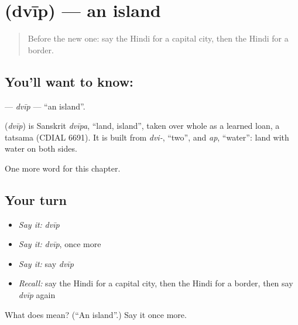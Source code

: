 \section[\texorpdfstring{\hi{द्वीप} (dvīp)}{द्वीप (dvīp)}]{ (dvīp) — an island}

\label{lesson:HI-C200-dvip}



\begin{quote}
Before the new one: say the Hindi for a capital city, then the Hindi for a border.
\end{quote}

\subsection*{You'll want to know: }
\textbf{} — \emph{dvīp} — \textquotedblleft{}an island\textquotedblright{}.

\begin{cousinweb}
\textbf{} (\emph{dvīp}) is Sanskrit \emph{dvīpa}, \textquotedblleft{}land, island\textquotedblright{}, taken over whole as a learned loan, a tatsama (CDIAL 6691). It is built from \emph{dvi-}, \textquotedblleft{}two\textquotedblright{}, and \emph{ap}, \textquotedblleft{}water\textquotedblright{}: land with water on both sides.
\end{cousinweb}

\begin{grammarlens}[title={What you've built}]
One more word for this chapter.
\end{grammarlens}

\subsection*{Your turn}
\begin{itemize}
\raggedright
  \item \emph{Say it:} \emph{dvīp}
  \item \emph{Say it:} \emph{dvīp}, once more
  \item \emph{Say it:} say \emph{dvīp}
  \item \emph{Recall:} say the Hindi for a capital city, then the Hindi for a border, then say \emph{dvīp} again
\end{itemize}

\begin{tcolorbox}[breakable,colback=teal!4,colframe=teal!35!black,title={Before you move on}]
What does  mean? (\textquotedblleft{}An island\textquotedblright{}.) Say it once more.
\end{tcolorbox}
